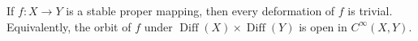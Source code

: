 If $f: X \to Y$ is a stable proper mapping, then every deformation of $f$ is trivial. Equivalently, the orbit of $f$ under $\operatorname{Diff}(X) \times \operatorname{Diff}(Y)$ is open in $C^\infty(X, Y)$.
